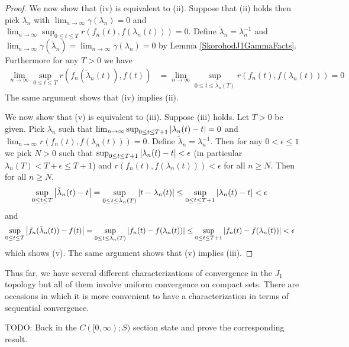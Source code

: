 \begin{proof}
We now show that (iv) is equivalent to (ii).  Suppose that (ii) holds then pick $\lambda_n$ with $\lim_{n \to \infty} \gamma(\lambda_n) = 0$ and $\lim_{n \to \infty} \sup_{0 \leq t \leq T} r(f_n(t), f(\lambda_n(t))) = 0$.  Define $\tilde{\lambda}_n =\lambda^{-1}_n$ and $\lim_{n \to \infty} \gamma(\tilde{\lambda}_n) = \lim_{n \to \infty} \gamma(\lambda_n) = 0$ by Lemma \ref{SkorohodJ1GammaFacts}.  Furthermore for any $T > 0$ we have
\begin{align*}
\lim_{n \to \infty} \sup_{0 \leq t \leq T} r(f_n(\tilde{\lambda}_n(t)), f(t)) &= \lim_{n \to \infty} \sup_{0 \leq t \leq \tilde{\lambda}_n(T)} r(f_n(t), f(\lambda_n(t))) = 0
\end{align*}
The same argument shows that (iv) implies (ii).

We now show that (v) is equivalent to (iii).  Suppose (iii) holds.  Let $T>0$ be given.  Pick $\lambda_n$ such that $\lim_{n \to \infty} \sup_{0 \leq t \leq T+1} \left \vert \lambda_n(t) - t \right \vert =0$
and $\lim_{n \to \infty} r(f_n(t), f(\lambda_n(t))) = 0$.  Define $\tilde{\lambda}_n =\lambda^{-1}_n$.  Then for any $0 < \epsilon \leq 1$ we pick $N >0$ such that $\sup_{0 \leq t \leq T+1} \left \vert \lambda_n(t) - t \right \vert < \epsilon$ (in particular $\lambda_n(T) < T + \epsilon \leq T+1$) and $ r(f_n(t), f(\lambda_n(t))) < \epsilon$ for all $n \geq N$.  Then for all $n \geq N$,
\begin{align*}
\sup_{0 \leq t \leq T} \left \vert \tilde{\lambda}_n(t) - t \right \vert &= \sup_{0 \leq t \leq \lambda_n(T)} \left \vert t - \lambda_n(t) \right \vert \leq \sup_{0 \leq t \leq T+1} \left \vert \lambda_n(t) - t \right \vert < \epsilon
\end{align*}
and
\begin{align*}
\sup_{0 \leq t \leq T} \left \vert f_n(\tilde{\lambda}_n(t)) - f(t) \right \vert &= \sup_{0 \leq t \leq \lambda_n(T)} \left \vert f_n(t) - f(\lambda_n(t)) \right \vert \leq \sup_{0 \leq t \leq T+1} \left \vert f_n(t) - f(\lambda_n(t)) \right \vert< \epsilon
\end{align*}
which shows (v).  The same argument shows that (v) implies (iii).
\end{proof}

Thus far, we have several different characterizations of convergence in the $J_1$ topology but all of them involve uniform convergence on compact sets.  There
are occasions in which it is more convenient to have a characterization in terms of sequential convergence.  

TODO: Back in the $C([0,\infty); S)$ section state and prove the corresponding result.

